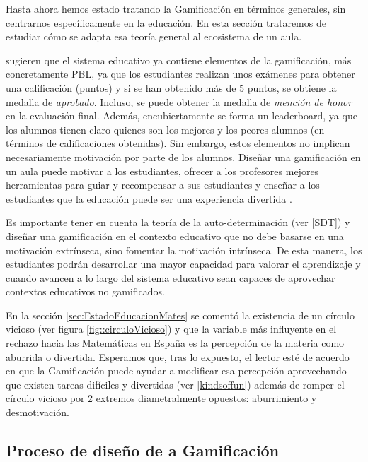 Hasta ahora hemos estado tratando la Gamificación en términos generales, sin centrarnos específicamente en la educación. 
%
En esta sección trataremos de estudiar cómo se adapta esa teoría general al ecosistema de un aula.



\cite{lee2011gamification} sugieren que el sistema educativo ya contiene elementos de la gamificación, más concretamente \gls{PBL}, ya que los estudiantes realizan unos exámenes para obtener una calificación (puntos) y si se han obtenido más de 5 puntos, se obtiene la medalla de \textit{aprobado}.
%
Incluso, se puede obtener la medalla de \textit{mención de honor} en la evaluación final.
%
Además, encubiertamente se forma un leaderboard, ya que los alumnos tienen claro quienes son los mejores y los peores alumnos (en términos de calificaciones obtenidas).
%
Sin embargo, estos elementos no implican necesariamente motivación por parte de los alumnos.
%
Diseñar una gamificación en un aula puede motivar a los estudiantes, ofrecer a los profesores mejores herramientas para guiar y recompensar a sus estudiantes y enseñar a los estudiantes que la educación puede ser una experiencia divertida \cite{lee2011gamification}.

Es importante tener en cuenta la teoría de la auto-determinación (ver \ref{SDT}) y diseñar una gamificación en el contexto educativo que no debe basarse en una motivación extrínseca, sino fomentar la motivación intrínseca. 
%
De esta manera, los estudiantes podrán desarrollar una mayor capacidad para valorar el aprendizaje y cuando avancen a lo largo del sistema educativo sean capaces de aprovechar contextos educativos no gamificados. 


En la sección \ref{sec:EstadoEducacionMates} se comentó la existencia de un círculo vicioso (ver figura \ref{fig::circuloVicioso}) y que la variable más influyente en el rechazo hacia las Matemáticas en España es la percepción de la materia como aburrida o divertida.
%
Esperamos que, tras lo expuesto, el lector esté de acuerdo en que la Gamificación puede ayudar a modificar esa percepción aprovechando que existen tareas difíciles y divertidas (ver \ref{kindsoffun}) además de romper el círculo vicioso por 2 extremos diametralmente opuestos: aburrimiento y desmotivación.



\subsection{Proceso de diseño de a Gamificación}

